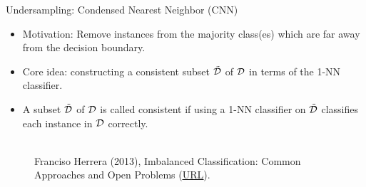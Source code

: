 \documentclass[11pt,compress,t,notes=noshow, xcolor=table]{beamer}
\begin{document}
	
	
	\begin{frame}{Undersampling: Condensed Nearest Neighbor (CNN)}
	
	    \footnotesize{
		\begin{itemize}
		
			\item Motivation: Remove instances from the majority class(es) which are far away from the decision boundary. 
            \item Core idea: constructing a consistent subset $\tilde{\mathcal{D}}$ of $\mathcal{D}$ in terms of the 1-NN classifier. 

			\item A subset $\tilde{\mathcal{D}}$ of $\mathcal{D}$ is called consistent if using a 1-NN classifier on $\tilde{\mathcal{D}}$ classifies each instance in $\mathcal{D}$ correctly.
	
		\end{itemize}

        \begin{figure}
            \centering
            			\tiny
            \\ Franciso Herrera (2013), Imbalanced Classification: Common
            Approaches and Open Problems (\href{https://sci2s.ugr.es/sites/default/files/files/TutorialsAndPlenaryTalks/SSTiC-Trends in-Classification-Imbalanced-data-sets.pdf}{\underline{URL}}).
        \end{figure}	
	   }
    \end{frame}
\end{document}

